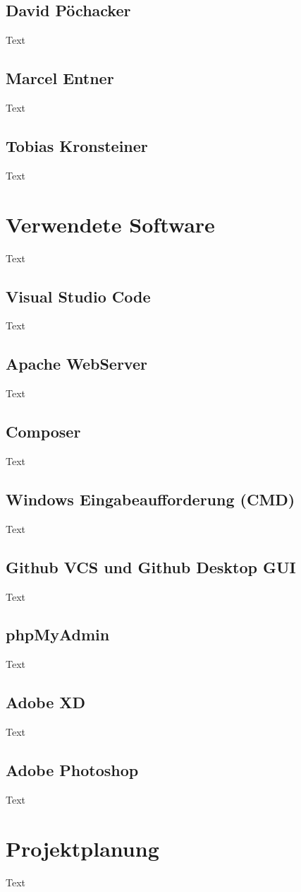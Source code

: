 \subsection{David Pöchacker}
Text
\subsection{Marcel Entner}
Text
\subsection{Tobias Kronsteiner}
Text


\section{Verwendete Software}
Text
\subsection{Visual Studio Code}
Text
\subsection{Apache WebServer}
Text
\subsection{Composer}
Text
\subsection{Windows Eingabeaufforderung (CMD)}
Text
\subsection{Github VCS und Github Desktop GUI}
Text
\subsection{ phpMyAdmin}
Text
\subsection{Adobe XD}
Text
\subsection{Adobe Photoshop}
Text



\section{Projektplanung}
Text
